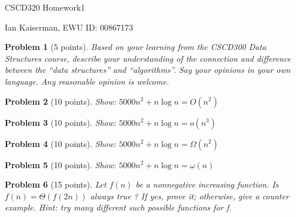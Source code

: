 \documentclass[11pt]{article}
\newtheorem{problem}{Problem}
\begin{document}
\begin{center}
  {\LARGE CSCD320 Homework1}

\bigskip 

{\Large Ian Kaiserman, EWU ID: 00867173}

\end{center}

\bigskip 

\begin{problem}[5 points]
\label{prob:1}
Based on your learning from the CSCD300 Data Structures course, describe your
understanding of the connection and difference between the “data structures” and “algorithms”. Say your
opinions in your own language. Any reasonable opinion is welcome.
\end{problem}



\begin{problem}[10 points]
\label{prob:2}
Show: $5000n^2+n\log n=O(n^2)$
\end{problem}




\begin{problem}[10 points]
\label{prob:3}
Show: $5000n^2+n\log n=o(n^3)$
\end{problem}




\begin{problem}[10 points]
\label{prob:4}
Show: $5000n^2+n\log n=\Omega(n^2)$
\end{problem}





\begin{problem}[10 points]
\label{prob:5}
Show: $5000n^2+n\log n=\omega(n)$
\end{problem}



\begin{problem}[15 points]
\label{prob:6}
Let $f(n)$ be a nonnegative increasing function. Is $f(n) = \Theta(f(2n))$ always true ?
If yes, prove it; otherwise, give a counter example. Hint: try many different such possible functions for f.
\end{problem}



\end{document}
